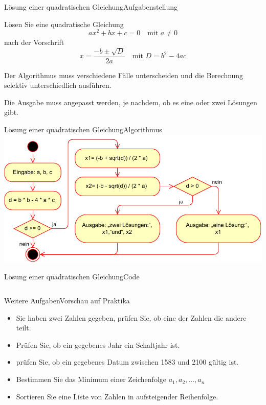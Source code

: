 \documentclass[xelatex,aspectratio=169]{beamer}
\begin{document}
\begin{frame}{Lösung einer quadratischen Gleichung}{Aufgabenstellung}

  Lösen Sie eine quadratische Gleichung
  \[
    ax^2 + bx + c = 0 \quad \text{mit } a \neq 0
  \]
  nach der Vorschrift
  \[
    x = \frac{-b \pm \sqrt{D}}{2a} \quad \text{mit } D = b^2 - 4ac
  \]

  Der Algorithmus muss verschiedene Fälle unterscheiden und die Berechnung selektiv unterschiedlich ausführen.

  Die Ausgabe muss angepasst werden, je nachdem, ob es eine oder zwei Lösungen gibt.
\end{frame}

\begin{frame}{Lösung einer quadratischen Gleichung}{Algorithmus}
  \centering\includegraphics[height=.7\textheight]{fig/algorithmus_quadratic_equation.pdf}
\end{frame}

\begin{frame}{Lösung einer quadratischen Gleichung}{Code}
  \inputminted{python}{src/algorithmus_quadratic_equation.py}
\end{frame}

\begin{frame}{Weitere Aufgaben}{Vorschau auf Praktika}
  \begin{itemize}
    \item Sie haben zwei Zahlen gegeben, prüfen Sie, ob eine der Zahlen die andere teilt.
    \item Prüfen Sie, ob ein gegebenes Jahr ein Schaltjahr ist.
    \item prüfen Sie, ob ein gegebenes Datum zwischen 1583 und 2100 gültig ist.
    \item Bestimmen Sie das Minimum einer Zeichenfolge \(a_1, a_2, \ldots, a_n\)
    \item Sortieren Sie eine Liste von Zahlen in aufsteigender Reihenfolge.
  \end{itemize}
\end{frame}
\end{document}
